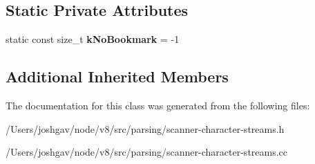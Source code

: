 \subsection*{Static Private Attributes}
\begin{DoxyCompactItemize}
\item 
static const size\+\_\+t {\bfseries k\+No\+Bookmark} = -\/1\hypertarget{classv8_1_1internal_1_1_external_two_byte_string_utf16_character_stream_a0d835dd8898e5ba24fd6ef2ebb98430e}{}\label{classv8_1_1internal_1_1_external_two_byte_string_utf16_character_stream_a0d835dd8898e5ba24fd6ef2ebb98430e}

\end{DoxyCompactItemize}
\subsection*{Additional Inherited Members}


The documentation for this class was generated from the following files\+:\begin{DoxyCompactItemize}
\item 
/\+Users/joshgav/node/v8/src/parsing/scanner-\/character-\/streams.\+h\item 
/\+Users/joshgav/node/v8/src/parsing/scanner-\/character-\/streams.\+cc\end{DoxyCompactItemize}
